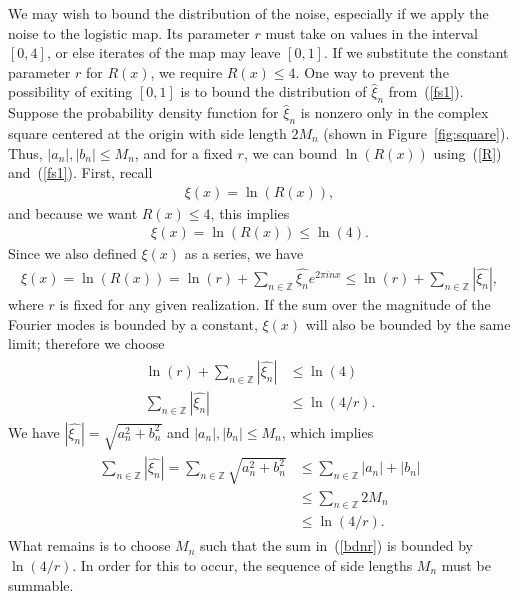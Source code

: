 We may wish to bound the distribution of the noise, especially if we
apply the noise to the logistic map. Its parameter $r$ must take on
values in the interval $[0,4]$, or else iterates of the map may leave $[0,1]$. If we
substitute the constant parameter $r$ for $R(x)$, we require
$R(x) \leq 4$. One way to prevent the possibility of exiting $[0,1]$ is to bound the distribution of $\hat{\xi}_n$ from~(\ref{fs1}). Suppose the probability density
function for $\hat{\xi}_n$ is nonzero only in the complex square centered at the
origin with side length $2M_n$ (shown in Figure~\ref{fig:square}). Thus, $|a_n|,|b_n| \leq M_n$, and for a fixed $r$, we
can bound $\ln(R(x))$ using~(\ref{R}) and~(\ref{fs1}). First, recall
\begin{align*}
\xi(x) = \ln(R(x)),
\end{align*}
and because we want $R(x) \leq 4$, this implies
\begin{align*}
\xi(x) = \ln(R(x)) \leq \ln(4).
\end{align*}
Since we also defined $\xi(x)$ as a series, we have
\begin{align*}
\xi(x) =\ln(R(x))= \ln(r) + \sum_{n \in \mathbb{Z}}\hat{\xi_n}e^{2\pi inx} \leq \ln(r) + \sum_{n \in \mathbb{Z}}|\hat{\xi_n}|,
\end{align*}
where $r$ is fixed for any given realization. If the sum over the magnitude of the Fourier modes is bounded by a constant, $\xi(x)$ will also be bounded by the same limit; therefore we choose
\begin{align*}
\begin{split}
\ln(r) + \sum_{n \in \mathbb{Z}}|\hat{\xi_n}| &\leq \ln(4)\\
\sum_{n \in \mathbb{Z}}|\hat{\xi_n}| &\leq \ln(4/r).
\end{split}
\end{align*}
We have $|\hat{\xi_n}| = \sqrt{a_n^2 + b_n^2}$ and $|a_n|,|b_n| \leq M_n$, which implies
\begin{align}
\begin{split}\label{bdnr}
\sum_{n \in \mathbb{Z}}|\hat{\xi_n}| =\sum_{n \in \mathbb{Z}}\sqrt{a_n^2 + b_n^2} &\leq \sum_{n \in
  \mathbb{Z}}|a_n| + |b_n|\\
&\leq \sum_{n \in \mathbb{Z}}2M_n\\
&\leq \ln(4/r).
\end{split}
\end{align}
What remains is to choose $M_n$ such that the sum in~(\ref{bdnr}) is
bounded by $\ln(4/r)$. In order for this to occur, the sequence of side lengths $M_n$ must be summable. 

